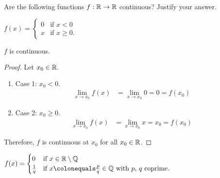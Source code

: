 \begin{problem}
  Are the following functions $f : \mathbb{R} \to \mathbb{R}$ continuous?
  Justify your answer.

  \begin{enumroman}
    \item $\displaystyle f(x) = \begin{cases}
        0 & \text{if } x < 0 \\
        x & \text{if } x \geq 0.
      \end{cases}$
      \begin{answer}
        $f$ is continuous.
        \begin{proof}
          Let $x_0 \in \mathbb{R}$.
          \begin{enumerate}
            \item Case 1: $x_0 < 0$.
              \begin{align*}
                \lim_{x \to x_0}{f(x)} &= \lim_{x \to x_0}{0} = 0 = f(x_0)
              \end{align*}
            \item Case 2: $x_0 \geq 0$.
              \begin{align*}
                \lim_{x \to x_0}{f(x)} &= \lim_{x \to x_0}{x} = x_0 = f(x_0)
              \end{align*}
          \end{enumerate}
          Therefore, $f$ is continuous at $x_0$ for all $x_0 \in \mathbb{R}$.
        \end{proof}
      \end{answer}

    \item $\displaystyle f(x) = \begin{cases}
        0 & \text{if } x \in \R \setminus \Q \\
        \frac{1}{q} & \text{if } x \colonequals \frac{p}{q} \in \Q \text{ with $p$, $q$ coprime}.
      \end{cases}$


\end{enumroman}
\end{problem}
